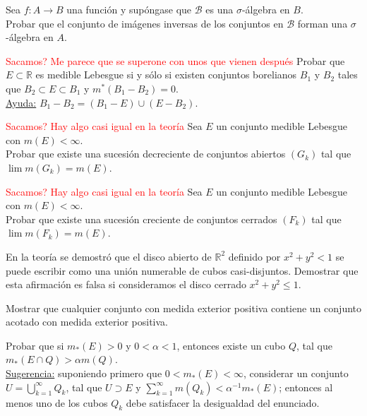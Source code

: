 \documentclass{book}
\newcommand{\rr}{\mathbb{R}}
\newcommand{\di}{\displaystyle}
\begin{document}
\begin{ejer}{} 
Sea $f: A\to B$ una funci\'on  y sup\'ongase que $\mathscr{B}$ es una $\sigma$-\'algebra en $B$. \\
Probar que el conjunto de im\'agenes inversas de los conjuntos en $\mathscr{B}$  forman una 
$\sigma$-\'algebra en $A$. 
\end{ejer}
 
\begin{ejer}{} \textcolor{red}{Sacamos? Me parece que se superone con unos que vienen después}
Probar que $E\subset \rr$ es medible Lebesgue si y s\'olo si existen conjuntos borelianos $B_1$
 y $B_2$ tales que $B_2\subset E\subset B_1$ y $m^*(B_1-B_2)=0$.
\\
\underline{Ayuda:} $B_1-B_2=(B_1-E)\cup (E-B_2)$. 
\end{ejer} 


\begin{ejer}{} \textcolor{red}{Sacamos? Hay algo casi igual en la teoría}
 Sea $E$ un conjunto medible Lebesgue con $m(E)<\infty$.
\\Probar que existe una sucesi\'on decreciente de conjuntos abiertos $(G_k)$ tal que
$\lim m(G_k)=m (E)$.
\end{ejer} 



\begin{ejer}{} \textcolor{red}{Sacamos? Hay algo casi igual en la teoría}
 Sea  $E$ un conjunto medible Lebesgue con $m(E)<\infty$.\\
Probar que existe una sucesi\'on creciente de conjuntos cerrados $(F_k)$ tal que
$\lim m(F_k)=m (E)$.
\end{ejer} 


	
\begin{ejer}{}
  En la teoría se demostró que el disco abierto  de $\rr^2$ definido por  $x^2+y^2< 1$ se puede escribir como una unión numerable de cubos casi-disjuntos. Demostrar que esta afirmación es falsa si consideramos el disco cerrado  $x^2+y^2\leq 1$.  
	\end{ejer}



 \begin{ejer}{} 
	Mostrar que cualquier conjunto con medida exterior positiva contiene un conjunto acotado con medida exterior positiva. 
	\end{ejer}
 
  \begin{ejer}{} 
	Probar que si $m_*(E)>0$ y $0<\alpha<1$, entonces existe un cubo $Q$, tal que
  $m_*(E\cap Q)>\alpha m(Q)$.
\\
  \underline{Sugerencia:} suponiendo primero que $0<m_*(E)<\infty$, considerar un conjunto
 $U=\di\bigcup_{k=1}^{\infty}Q_k$, tal que 
  $U\supset E$ y $\sum_{k=1}^{\infty}m(Q_k)<\alpha^{-1} m_*(E)$; entonces al menos uno de los cubos $Q_k$
  debe satisfacer la desigualdad del enunciado.
 \end{ejer} 
\end{document}
